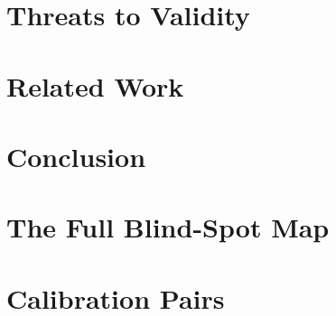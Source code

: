 \documentclass[sigconf,nonacm]{acmart}
\begin{document}
\section{Threats to Validity}


\section{Related Work}


\section{Conclusion}


\appendix
\section{The Full Blind-Spot Map}


\section{Calibration Pairs}




\end{document}

